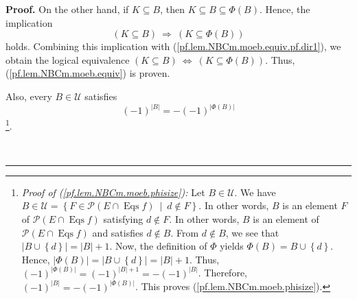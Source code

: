 \documentclass[numbers=enddot,12pt,final,onecolumn,notitlepage]{scrartcl}%
\theoremstyle{definition}
\newenvironment{proof}[1][Proof]{\noindent\textbf{#1.} }{\ \rule{0.5em}{0.5em}}
\newenvironment{verlong}{}{}
\begin{document}
\begin{verlong}
\begin{proof}
On the other hand, if $K\subseteq B$, then $K\subseteq B\subseteq\Phi\left(
B\right)  $. Hence, the implication%
\[
\left(  K\subseteq B\right)  \ \Longrightarrow\ \left(  K\subseteq\Phi\left(
B\right)  \right)
\]
holds. Combining this implication with (\ref{pf.lem.NBCm.moeb.equiv.pf.dir1}),
we obtain the logical equivalence $\left(  K\subseteq B\right)
\ \Longleftrightarrow\ \left(  K\subseteq\Phi\left(  B\right)  \right)  $.
Thus, (\ref{pf.lem.NBCm.moeb.equiv}) is proven.

Also, every $B\in\mathcal{U}$ satisfies%
\begin{equation}
\left(  -1\right)  ^{\left\vert B\right\vert }=-\left(  -1\right)
^{\left\vert \Phi\left(  B\right)  \right\vert }
\label{pf.lem.NBCm.moeb.phisize}%
\end{equation}
\footnote{\textit{Proof of (\ref{pf.lem.NBCm.moeb.phisize}):} Let
$B\in\mathcal{U}$. We have $B\in\mathcal{U}=\left\{  F\in\mathcal{P}\left(
E\cap\operatorname*{Eqs}f\right)  \ \mid\ d\notin F\right\}  $. In other
words, $B$ is an element $F$ of $\mathcal{P}\left(  E\cap\operatorname*{Eqs}%
f\right)  $ satisfying $d\notin F$. In other words, $B$ is an element of
$\mathcal{P}\left(  E\cap\operatorname*{Eqs}f\right)  $ and satisfies $d\notin
B$. From $d\notin B$, we see that $\left\vert B\cup\left\{  d\right\}
\right\vert =\left\vert B\right\vert +1$. Now, the definition of $\Phi$ yields
$\Phi\left(  B\right)  =B\cup\left\{  d\right\}  $. Hence, $\left\vert
\Phi\left(  B\right)  \right\vert =\left\vert B\cup\left\{  d\right\}
\right\vert =\left\vert B\right\vert +1$. Thus, $\left(  -1\right)
^{\left\vert \Phi\left(  B\right)  \right\vert }=\left(  -1\right)
^{\left\vert B\right\vert +1}=-\left(  -1\right)  ^{\left\vert B\right\vert }%
$. Therefore, $\left(  -1\right)  ^{\left\vert B\right\vert }=-\left(
-1\right)  ^{\left\vert \Phi\left(  B\right)  \right\vert }$. This proves
(\ref{pf.lem.NBCm.moeb.phisize}).}.


\end{proof}
\end{verlong}
\end{document}
